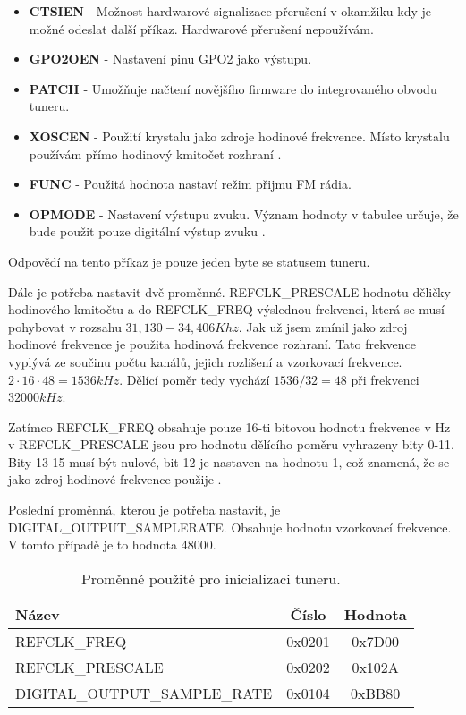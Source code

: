 \begin{itemize}
\item \textbf{CTSIEN} - Možnost hardwarové signalizace přerušení v okamžiku kdy je možné odeslat další příkaz. Hardwarové přerušení nepoužívám.
\item \textbf{GPO2OEN} - Nastavení pinu GPO2 jako výstupu.
\item \textbf{PATCH} - Umožňuje načtení novějšího firmware do integrovaného obvodu tuneru.
\item \textbf{XOSCEN} - Použití krystalu jako zdroje hodinové frekvence. Místo krystalu používám přímo hodinový kmitočet rozhraní \iis.
\item \textbf{FUNC} - Použitá hodnota nastaví režim přijmu FM rádia.
\item \textbf{OPMODE} - Nastavení výstupu zvuku. Význam hodnoty v tabulce určuje, že bude použit pouze digitální výstup zvuku \iis.
\end{itemize}

Odpovědí na tento příkaz je pouze jeden byte se statusem tuneru.

Dále je potřeba nastavit dvě proměnné. REFCLK\_PRESCALE hodnotu děličky hodinového kmitočtu a do REFCLK\_FREQ výslednou frekvenci, která se musí pohybovat v rozsahu $ 31,130 - 34,406 Khz $. Jak už jsem zmínil jako zdroj hodinové frekvence je použita hodinová frekvence \iis rozhraní. Tato frekvence vyplývá ze součinu počtu kanálů, jejich rozlišení a vzorkovací frekvence. $ 2 \cdot 16 \cdot 48 = 1536 kHz $. Dělící poměr tedy vychází $ 1536 / 32 = 48 $ při frekvenci $ 32000 kHz $.

Zatímco REFCLK\_FREQ obsahuje pouze 16-ti bitovou hodnotu frekvence v Hz v REFCLK\_PRESCALE jsou pro hodnotu dělícího poměru vyhrazeny bity 0-11. Bity 13-15 musí být nulové, bit 12 je nastaven na hodnotu 1, což znamená, že se jako zdroj hodinové frekvence použije \iis.

Poslední proměnná, kterou je potřeba nastavit, je DIGITAL\_OUTPUT\_SAMPLERATE. Obsahuje hodnotu vzorkovací frekvence. V tomto případě je to hodnota 48000.

\begin{table}[ht!]
\begin{center}
\begin{tabular}{|l|c|c|}
\hline 
Název & Číslo & Hodnota \\ 
\hline 
REFCLK\_FREQ & 0x0201 & 0x7D00 \\ 
\hline 
REFCLK\_PRESCALE & 0x0202 & 0x102A \\ 
\hline 
DIGITAL\_OUTPUT\_SAMPLE\_RATE & 0x0104 & 0xBB80 \\ 
\hline 
\end{tabular} 
\end{center}
\caption{Proměnné použité pro inicializaci tuneru.}
\label{tab:tuner-init-prop} 
\end{table}

